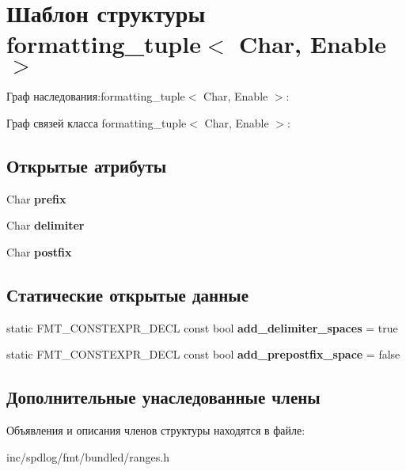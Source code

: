 \hypertarget{structformatting__tuple}{}\section{Шаблон структуры formatting\+\_\+tuple$<$ Char, Enable $>$}
\label{structformatting__tuple}


Граф наследования\+:formatting\+\_\+tuple$<$ Char, Enable $>$\+:


Граф связей класса formatting\+\_\+tuple$<$ Char, Enable $>$\+:
\subsection*{Открытые атрибуты}
\begin{DoxyCompactItemize}
\item 
\mbox{\label{structformatting__tuple_a0782dad994369d31b822bcd23456dcd6}} 
Char {\bfseries prefix}
\item 
\mbox{\label{structformatting__tuple_a41a084f3a72cc6bfa848e57dff30b4ed}} 
Char {\bfseries delimiter}
\item 
\mbox{\label{structformatting__tuple_a7e5bf94913811fbd2b551e38c88146d6}} 
Char {\bfseries postfix}
\end{DoxyCompactItemize}
\subsection*{Статические открытые данные}
\begin{DoxyCompactItemize}
\item 
\mbox{\label{structformatting__tuple_ac37833d9d42f1fe21c2203a8621e71d6}} 
static F\+M\+T\+\_\+\+C\+O\+N\+S\+T\+E\+X\+P\+R\+\_\+\+D\+E\+CL const bool {\bfseries add\+\_\+delimiter\+\_\+spaces} = true
\item 
\mbox{\label{structformatting__tuple_a607427f209e091fc99bf81648ae1e882}} 
static F\+M\+T\+\_\+\+C\+O\+N\+S\+T\+E\+X\+P\+R\+\_\+\+D\+E\+CL const bool {\bfseries add\+\_\+prepostfix\+\_\+space} = false
\end{DoxyCompactItemize}
\subsection*{Дополнительные унаследованные члены}


Объявления и описания членов структуры находятся в файле\+:\begin{DoxyCompactItemize}
\item 
inc/spdlog/fmt/bundled/ranges.\+h\end{DoxyCompactItemize}
